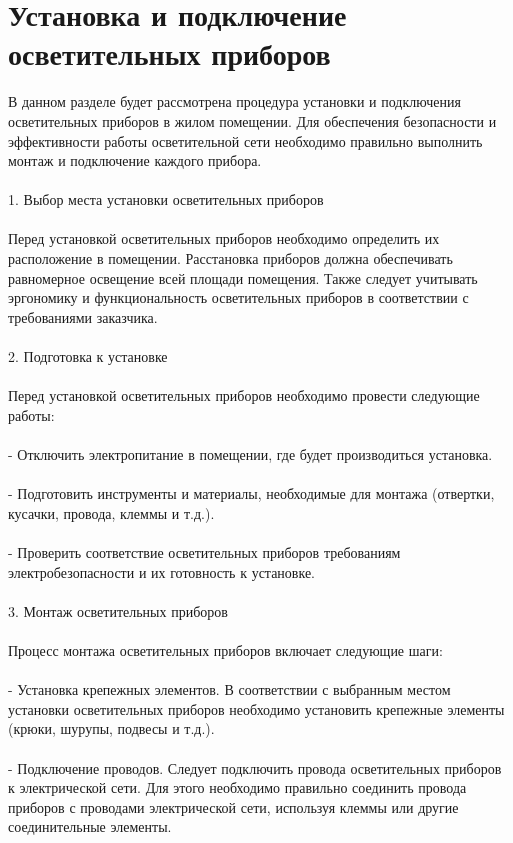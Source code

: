 \documentclass{article}
\begin{document}
\section{Установка и подключение осветительных приборов}
В данном разделе будет рассмотрена процедура установки и подключения осветительных приборов в жилом помещении. Для обеспечения безопасности и эффективности работы осветительной сети необходимо правильно выполнить монтаж и подключение каждого прибора.\\
~\\
1. Выбор места установки осветительных приборов\\
~\\
Перед установкой осветительных приборов необходимо определить их расположение в помещении. Расстановка приборов должна обеспечивать равномерное освещение всей площади помещения. Также следует учитывать эргономику и функциональность осветительных приборов в соответствии с требованиями заказчика.\\
~\\
2. Подготовка к установке\\
~\\
Перед установкой осветительных приборов необходимо провести следующие работы:\\
~\\
- Отключить электропитание в помещении, где будет производиться установка.\\
~\\
- Подготовить инструменты и материалы, необходимые для монтажа (отвертки, кусачки, провода, клеммы и т.д.).\\
~\\
- Проверить соответствие осветительных приборов требованиям электробезопасности и их готовность к установке.\\
~\\
3. Монтаж осветительных приборов\\
~\\
Процесс монтажа осветительных приборов включает следующие шаги:\\
~\\
- Установка крепежных элементов. В соответствии с выбранным местом установки осветительных приборов необходимо установить крепежные элементы (крюки, шурупы, подвесы и т.д.).\\
~\\
- Подключение проводов. Следует подключить провода осветительных приборов к электрической сети. Для этого необходимо правильно соединить провода приборов с проводами электрической сети, используя клеммы или другие соединительные элементы.\\
\end{document}
